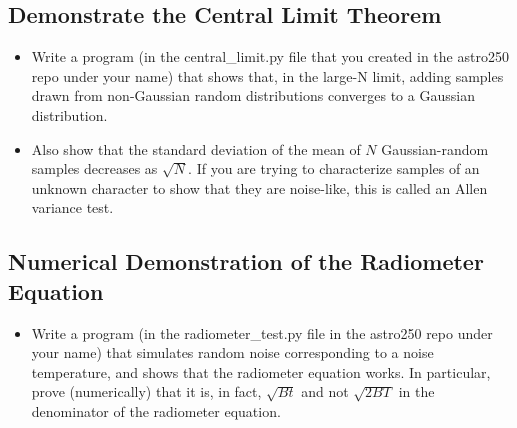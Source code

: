 \documentclass[11pt]{article}
\begin{document}
\subsection{Demonstrate the Central Limit Theorem}
\begin{itemize}
\item Write a program (in the central\_limit.py file that you created in the astro250 repo under your name)
that shows that, in the large-N limit, adding samples drawn from non-Gaussian random
distributions converges to a Gaussian distribution.
\item Also show that the standard deviation of the mean of $N$ Gaussian-random samples decreases as $\sqrt{N}$.
If you are trying to characterize samples of an unknown character to show that they are noise-like, this
is called an Allen variance test.
\end{itemize}

\subsection{Numerical Demonstration of the Radiometer Equation}
\begin{itemize}
\item Write a program (in the radiometer\_test.py file in the astro250 repo under your name) that simulates 
random noise corresponding to a noise temperature, and shows that the radiometer equation works.  In particular,
prove (numerically) that it is, in fact, $\sqrt{Bt}$ and not $\sqrt{2BT}$ in the denominator of the
radiometer equation.
\end{itemize}
\end{document}
